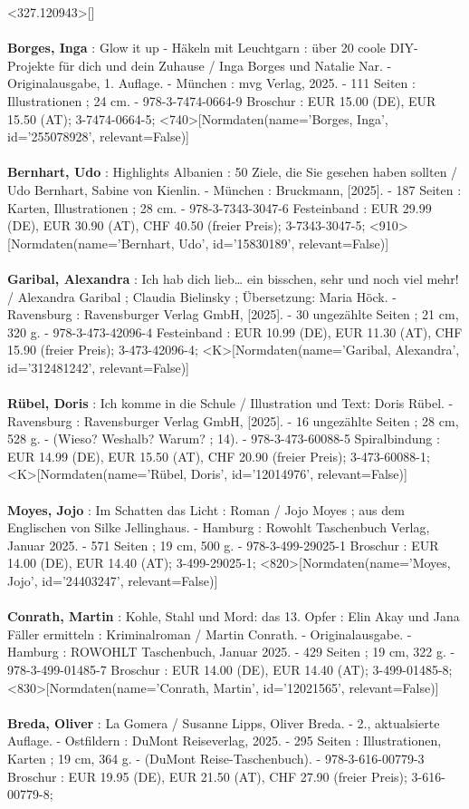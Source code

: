 \documentclass{article}
\begin{document}
\begin{multicols}{3}
<327.120943>[]\\\\\textbf{Borges, Inga} : Glow it up - Häkeln mit Leuchtgarn : über 20 coole DIY-Projekte für dich und dein Zuhause / Inga Borges und Natalie Nar. - Originalausgabe, 1. Auflage. - München : mvg Verlag, 2025. - 111 Seiten : Illustrationen ; 24 cm. - 978-3-7474-0664-9 Broschur : EUR 15.00 (DE), EUR 15.50 (AT); 3-7474-0664-5; <740>[Normdaten(name='Borges, Inga', id='255078928', relevant=False)]\\\\\textbf{Bernhart, Udo} : Highlights Albanien : 50 Ziele, die Sie gesehen haben sollten / Udo Bernhart, Sabine von Kienlin. - München : Bruckmann, [2025]. - 187 Seiten : Karten, Illustrationen ; 28 cm. - 978-3-7343-3047-6 Festeinband : EUR 29.99 (DE), EUR 30.90 (AT), CHF 40.50 (freier Preis); 3-7343-3047-5; <910>[Normdaten(name='Bernhart, Udo', id='15830189', relevant=False)]\\\\\textbf{Garibal, Alexandra} : Ich hab dich lieb… ein bisschen, sehr und noch viel mehr! / Alexandra Garibal ; Claudia Bielinsky ; Übersetzung: Maria Höck. - Ravensburg : Ravensburger Verlag GmbH, [2025]. - 30 ungezählte Seiten ; 21 cm, 320 g. - 978-3-473-42096-4 Festeinband : EUR 10.99 (DE), EUR 11.30 (AT), CHF 15.90 (freier Preis); 3-473-42096-4; <K>[Normdaten(name='Garibal, Alexandra', id='312481242', relevant=False)]\\\\\textbf{Rübel, Doris} : Ich komme in die Schule / Illustration und Text: Doris Rübel. - Ravensburg : Ravensburger Verlag GmbH, [2025]. - 16 ungezählte Seiten ; 28 cm, 528 g. - (Wieso? Weshalb? Warum? ; 14). - 978-3-473-60088-5 Spiralbindung : EUR 14.99 (DE), EUR 15.50 (AT), CHF 20.90 (freier Preis); 3-473-60088-1; <K>[Normdaten(name='Rübel, Doris', id='12014976', relevant=False)]\\\\\textbf{Moyes, Jojo} : Im Schatten das Licht : Roman / Jojo Moyes ; aus dem Englischen von Silke Jellinghaus. - Hamburg : Rowohlt Taschenbuch Verlag, Januar 2025. - 571 Seiten ; 19 cm, 500 g. - 978-3-499-29025-1 Broschur : EUR 14.00 (DE), EUR 14.40 (AT); 3-499-29025-1; <820>[Normdaten(name='Moyes, Jojo', id='24403247', relevant=False)]\\\\\textbf{Conrath, Martin} : Kohle, Stahl und Mord: das 13. Opfer : Elin Akay und Jana Fäller ermitteln : Kriminalroman / Martin Conrath. - Originalausgabe. - Hamburg : ROWOHLT Taschenbuch, Januar 2025. - 429 Seiten ; 19 cm, 322 g. - 978-3-499-01485-7 Broschur : EUR 14.00 (DE), EUR 14.40 (AT); 3-499-01485-8; <830>[Normdaten(name='Conrath, Martin', id='12021565', relevant=False)]\\\\\textbf{Breda, Oliver} : La Gomera / Susanne Lipps, Oliver Breda. - 2., aktualsierte Auflage. - Ostfildern : DuMont Reiseverlag, 2025. - 295 Seiten : Illustrationen, Karten ; 19 cm, 364 g. - (DuMont Reise-Taschenbuch). - 978-3-616-00779-3 Broschur : EUR 19.95 (DE), EUR 21.50 (AT), CHF 27.90 (freier Preis); 3-616-00779-8; 
\end{multicols}
\end{document}
